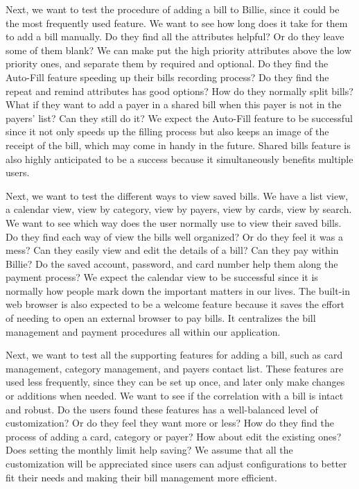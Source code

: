 \documentclass{sigchi}
\begin{document}
Next, we want to test the procedure of adding a bill to Billie, since it could be the most frequently used feature. We want to see how long does it take for them to add a bill manually. Do they find all the attributes helpful? Or do they leave some of them blank? We can make put the high priority attributes above the low priority ones, and separate them by required and optional. Do they find the Auto-Fill feature speeding up their bills recording process? Do they find the repeat and remind attributes has good options? How do they normally split bills? What if they want to add a payer in a shared bill when this payer is not in the payers' list? Can they still do it? We expect the Auto-Fill feature to be successful since it not only speeds up the filling process but also keeps an image of the receipt of the bill, which may come in handy in the future. Shared bills feature is also highly anticipated to be a success because it simultaneously benefits multiple users.
 
Next, we want to test the different ways to view saved bills. We have a list view, a calendar view, view by category, view by payers, view by cards, view by search. We want to see which way does the user normally use to view their saved bills. Do they find each way of view the bills well organized? Or do they feel it was a mess? Can they easily view and edit the details of a bill? Can they pay within Billie? Do the saved account, password, and card number help them along the payment process? We expect the calendar view to be successful since it is normally how people mark down the important matters in our lives. The built-in web browser is also expected to be a welcome feature because it saves the effort of needing to open an external browser to pay bills. It centralizes the bill management and payment procedures all within our application.

Next, we want to test all the supporting features for adding a bill, such as card management, category management, and payers contact list. These features are used less frequently, since they can be set up once, and later only make changes or additions when needed. We want to see if the correlation with a bill is intact and robust. Do the users found these features has a well-balanced level of customization? Or do they feel they want more or less? How do they find the process of adding a card, category or payer? How about edit the existing ones? Does setting the monthly limit help saving? We assume that all the customization will be appreciated since users can adjust configurations to better fit their needs and making their bill management more efficient.
\end{document}
